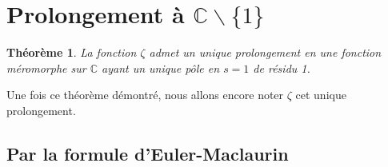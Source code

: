 \documentclass[french]{report}
\newtheorem{theorem}{Théorème}[section]
\begin{document}
\section{Prolongement à $\mathbb{C}\backslash\{1\}$}

\begin{theorem}
  La fonction $\zeta$ admet un unique prolongement en une fonction méromorphe sur $\mathbb{C}$ ayant un unique pôle en $s=1$ de résidu 1.
\end{theorem}

Une fois ce théorème démontré, nous allons encore noter $\zeta$ cet unique prolongement.

\subsection{Par la formule d'Euler-Maclaurin}
\end{document}
